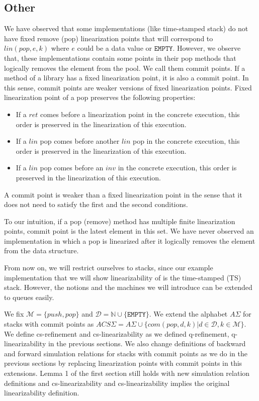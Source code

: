 \subsection{Other}



We have observed that some implementations (like time-stamped stack) do not have fixed remove (pop) linearization points that will correspond to $lin(pop,e,k)$ where $e$ could be a data value or $\texttt{EMPTY}$. However, we observe that, these implementations contain some points in their pop methods that logically removes the element from the pool. We call them commit points. If a method of a library has a fixed linearization  point, it is also a commit point. In this sense, commit points are weaker versions of fixed linearization points. Fixed linearization point of a pop preserves the following properties:
\begin{itemize}
\item If a $ret$ comes before a linearization point in the concrete execution, this order is preserved in the linearization of this execution.
\item If a $lin$ pop comes before another $lin$ pop in the concrete execution, this order is preserved in the linearization of this execution.
\item If a $lin$ pop comes before an $inv$ in the concrete execution, this order is preserved in the linearization of this execution. 
\end{itemize} 
A commit point is weaker than a fixed linearization point in the sense that it does not need to satisfy the first and the second conditions. 

To our intuition, if a pop (remove) method has multiple finite linearization points, commit point is the latest element in this set. We have never observed an implementation in which a pop is linearized after it logically removes the element from the data structure. 

From now on, we will restrict ourselves to stacks, since our example implementation that we will show linearizability of is the time-stamped (TS) stack. However, the notions and the machines we will introduce can be extended to queues easily. 

We fix $\mathcal{M} = \{push, pop\}$ and $\mathcal{D} = \mathbb{N} \cup \{\texttt{EMPTY}\}$. We extend the alphabet $A\Sigma$ for stacks with commit points as $ACS\Sigma = A\Sigma \cup \{com(pop,d,k)|d \in \mathcal{D}, k \in \mathcal{M}\}$. We define cs-refinement and cs-linearizability as we defined q-refinement, q-linearizability in the previous sections. We also change definitions of backward and forward simulation relations for stacks with commit points as we do in the previous sections by replacing linearization points with commit points in this extensions. Lemma 1 of the first section still holds with new simulation relation definitions and cs-linearizability and cs-linearizability implies the original linearizability definition. 

